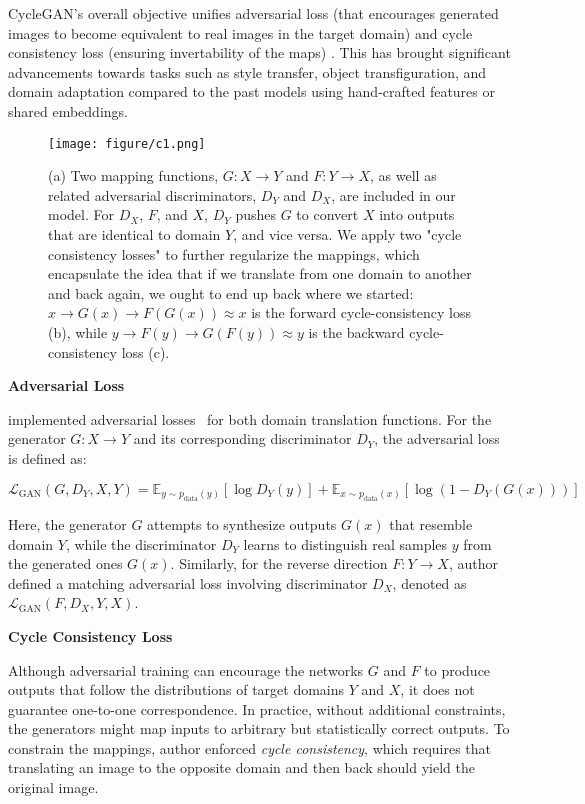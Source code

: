 \documentclass[pdflatex,sn-mathphys-num]{sn-jnl}%
\theoremstyle{thmstyleone}%
\theoremstyle{thmstyletwo}%
\theoremstyle{thmstylethree}%
\begin{document}
CycleGAN's overall objective unifies adversarial loss (that encourages generated images to become equivalent to real images in the target domain) and cycle consistency loss (ensuring invertability of the maps) \cite{chu2017cyclegan}. This has brought significant advancements towards tasks such as style transfer, object transfiguration, and domain adaptation compared to the past models using hand-crafted features or shared embeddings.

\begin{figure}[h]
\centering
\texttt{[image: figure/c1.png]}
\caption{(a) Two mapping functions, \( G: X \rightarrow Y \) and \( F: Y \rightarrow X \), as well as related adversarial discriminators, \( D_Y \) and \( D_X \), are included in our model. For \( D_X \), \( F \), and \( X \), \( D_Y \) pushes \( G \) to convert \( X \) into outputs that are identical to domain \( Y \), and vice versa. We apply two "cycle consistency losses" to further regularize the mappings, which encapsulate the idea that if we translate from one domain to another and back again, we ought to end up back where we started:  
\( x \rightarrow G(x) \rightarrow F(G(x)) \approx x \) is the forward cycle-consistency loss (b), while  \( y \rightarrow F(y) \rightarrow G(F(y)) \approx y \) is the backward cycle-consistency loss (c).
}\label{fig2}
\end{figure}

\textbf{Adversarial Loss}

\citet{zhu2017unpaired} implemented adversarial losses~\cite{goodfellow2014generative} for both domain translation functions. For the generator \( G: X \rightarrow Y \) and its corresponding discriminator \( D_Y \), the adversarial loss is defined as:

\[
\mathcal{L}_{\text{GAN}}(G, D_Y, X, Y) = \mathbb{E}_{y \sim p_{\text{data}}(y)}[\log D_Y(y)] + \mathbb{E}_{x \sim p_{\text{data}}(x)}[\log(1 - D_Y(G(x)))] \tag{1}
\]

Here, the generator \( G \) attempts to synthesize outputs \( G(x) \) that resemble domain \( Y \), while the discriminator \( D_Y \) learns to distinguish real samples \( y \) from the generated ones \( G(x) \). Similarly, for the reverse direction \( F: Y \rightarrow X \), author defined a matching adversarial loss involving discriminator \( D_X \), denoted as \( \mathcal{L}_{\text{GAN}}(F, D_X, Y, X) \).

\textbf{Cycle Consistency Loss}

Although adversarial training can encourage the networks \( G \) and \( F \) to produce outputs that follow the distributions of target domains \( Y \) and \( X \), it does not guarantee one-to-one correspondence. In practice, without additional constraints, the generators might map inputs to arbitrary but statistically correct outputs. To constrain the mappings, author enforced \textit{cycle consistency}, which requires that translating an image to the opposite domain and then back should yield the original image.
\end{document}
